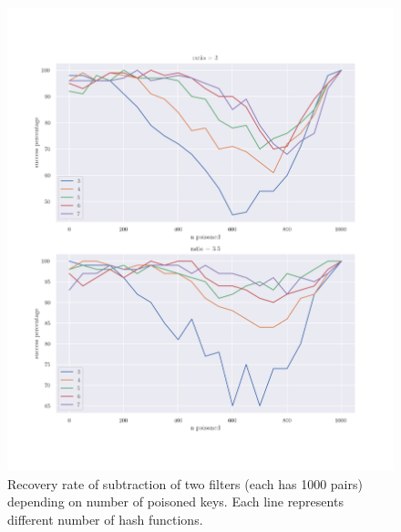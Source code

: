 \documentclass{article}
\begin{document}
\begin{figure}[h]
\centering
\includegraphics[scale=0.75]{./poisoned50.png}
\caption{Recovery rate of subtraction of two filters (each has 1000 pairs) depending on
number of poisoned keys. Each line represents different number of hash functions.}
\end{figure}



\end{document}
